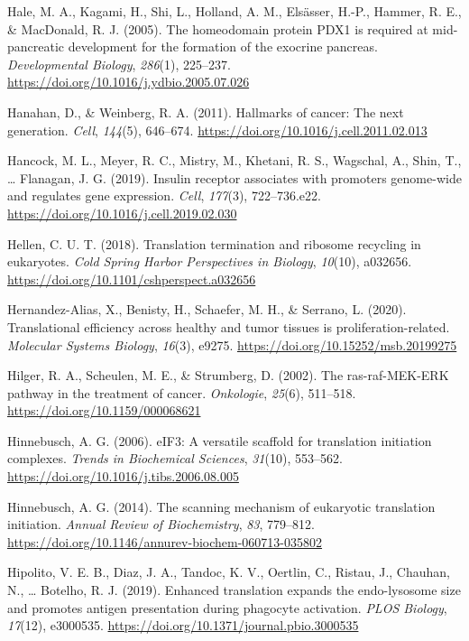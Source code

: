 \documentclass[12pt,openany]{book}
\begin{document}
\hypertarget{ref-Hale2005}{}
Hale, M. A., Kagami, H., Shi, L., Holland, A. M., Elsässer, H.-P.,
Hammer, R. E., \& MacDonald, R. J. (2005). The homeodomain protein PDX1
is required at mid-pancreatic development for the formation of the
exocrine pancreas. \emph{Developmental Biology}, \emph{286}(1),
225--237. \url{https://doi.org/10.1016/j.ydbio.2005.07.026}

\hypertarget{ref-Hanahan2011}{}
Hanahan, D., \& Weinberg, R. A. (2011). Hallmarks of cancer: The next
generation. \emph{Cell}, \emph{144}(5), 646--674.
\url{https://doi.org/10.1016/j.cell.2011.02.013}

\hypertarget{ref-Hancock2019}{}
Hancock, M. L., Meyer, R. C., Mistry, M., Khetani, R. S., Wagschal, A.,
Shin, T., \ldots{} Flanagan, J. G. (2019). Insulin receptor associates
with promoters genome-wide and regulates gene expression. \emph{Cell},
\emph{177}(3), 722--736.e22.
\url{https://doi.org/10.1016/j.cell.2019.02.030}

\hypertarget{ref-Hellen2018}{}
Hellen, C. U. T. (2018). Translation termination and ribosome recycling
in eukaryotes. \emph{Cold Spring Harbor Perspectives in Biology},
\emph{10}(10), a032656.
\url{https://doi.org/10.1101/cshperspect.a032656}

\hypertarget{ref-Hernandez-Alias2020}{}
Hernandez-Alias, X., Benisty, H., Schaefer, M. H., \& Serrano, L.
(2020). Translational efficiency across healthy and tumor tissues is
proliferation-related. \emph{Molecular Systems Biology}, \emph{16}(3),
e9275. \url{https://doi.org/10.15252/msb.20199275}

\hypertarget{ref-Hilger2002}{}
Hilger, R. A., Scheulen, M. E., \& Strumberg, D. (2002). The
ras-raf-MEK-ERK pathway in the treatment of cancer. \emph{Onkologie},
\emph{25}(6), 511--518. \url{https://doi.org/10.1159/000068621}

\hypertarget{ref-Hinnebusch2006}{}
Hinnebusch, A. G. (2006). eIF3: A versatile scaffold for translation
initiation complexes. \emph{Trends in Biochemical Sciences},
\emph{31}(10), 553--562.
\url{https://doi.org/10.1016/j.tibs.2006.08.005}

\hypertarget{ref-Hinnebusch2014}{}
Hinnebusch, A. G. (2014). The scanning mechanism of eukaryotic
translation initiation. \emph{Annual Review of Biochemistry}, \emph{83},
779--812. \url{https://doi.org/10.1146/annurev-biochem-060713-035802}

\hypertarget{ref-Hipolito2019}{}
Hipolito, V. E. B., Diaz, J. A., Tandoc, K. V., Oertlin, C., Ristau, J.,
Chauhan, N., \ldots{} Botelho, R. J. (2019). Enhanced translation
expands the endo-lysosome size and promotes antigen presentation during
phagocyte activation. \emph{PLOS Biology}, \emph{17}(12), e3000535.
\url{https://doi.org/10.1371/journal.pbio.3000535}
\end{document}
